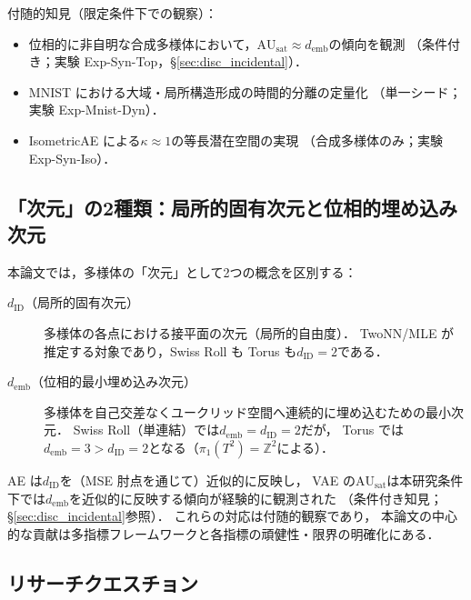\documentclass[11pt,a4paper]{jsarticle}
\newcommand{\dID}{d_{\mathrm{ID}}}
\newcommand{\kap}{\kappa}
\newcommand{\AUsat}{\mathrm{AU}_{\mathrm{sat}}}
\newcommand{\demb}{d_{\mathrm{emb}}}
\begin{document}
付随的知見（限定条件下での観察）：
\begin{itemize}
  \item 位相的に非自明な合成多様体において，$\AUsat \approx \demb$の傾向を観測
        （条件付き；実験 Exp-Syn-Top，§\ref{sec:disc_incidental}）．
  \item MNIST における大域・局所構造形成の時間的分離の定量化
        （単一シード；実験 Exp-Mnist-Dyn）．
  \item IsometricAE による$\kap \approx 1$の等長潜在空間の実現
        （合成多様体のみ；実験 Exp-Syn-Iso）．
\end{itemize}

\subsection{「次元」の2種類：局所的固有次元と位相的埋め込み次元}\label{sec:intro_dim}

本論文では，多様体の「次元」として2つの概念を区別する：

\begin{description}
  \item[$\dID$（局所的固有次元）]
        多様体の各点における接平面の次元（局所的自由度）．
        TwoNN/MLE が推定する対象であり，Swiss Roll も Torus も$\dID = 2$である．
  \item[$\demb$（位相的最小埋め込み次元）]
        多様体を自己交差なくユークリッド空間へ連続的に埋め込むための最小次元．
        Swiss Roll（単連結）では$\demb = \dID = 2$だが，
        Torus では$\demb = 3 > \dID = 2$となる（$\pi_1(T^2) = \mathbb{Z}^2$による）．
\end{description}

AE は$\dID$を（MSE 肘点を通じて）近似的に反映し，
VAE の$\AUsat$は本研究条件下では$\demb$を近似的に反映する傾向が経験的に観測された
（条件付き知見；§\ref{sec:disc_incidental}参照）．
これらの対応は付随的観察であり，
本論文の中心的な貢献は多指標フレームワークと各指標の頑健性・限界の明確化にある．

\subsection{リサーチクエスチョン}\label{sec:intro_rq}
\end{document}
